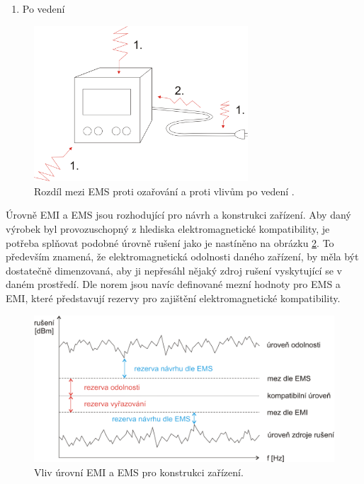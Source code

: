 \begin{itemize}
\begin{enumerate}
	\item Po vedení
	\end{enumerate}
	\begin{figure}[!h]
	\centering
	\includegraphics[width=8cm]{emc_ems.png}
	\caption{Rozdíl mezi EMS proti ozařování a proti vlivům po vedení .}
	\label{obr:emc_ems}
	\end{figure}
\end{itemize}

Úrovně EMI a EMS jsou rozhodující pro návrh a konstrukci zařízení. Aby daný výrobek byl provozuschopný z hlediska elektromagnetické kompatibility, je potřeba splňovat podobné úrovně rušení jako je nastíněno na obrázku \ref{obr:emc_meze}. To především znamená, že elektromagnetická odolnosti daného zařízení, by měla být dostatečně dimenzovaná, aby ji nepřesáhl nějaký zdroj rušení vyskytující se v daném prostředí. Dle norem jsou navíc definované mezní hodnoty pro EMS a EMI, které představují rezervy pro zajištění elektromagnetické kompatibility.
\begin{figure}[!h]
	\centering
	\includegraphics[width=14cm]{emc_meze.png}
	\caption{Vliv úrovní EMI a EMS pro konstrukci zařízení.}
	\label{obr:emc_meze}
\end{figure}

